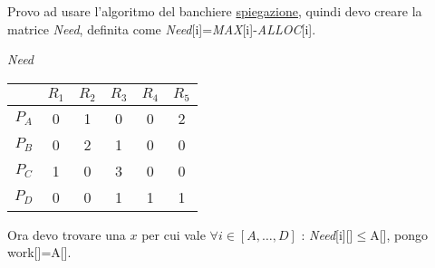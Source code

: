 \documentclass{article}
\begin{document}
    Provo ad usare l'algoritmo del banchiere \href{https://www.youtube.com/watch?app=desktop&v=LcspXXBImEo}{spiegazione}, quindi devo creare la matrice \emph{Need}, definita come \emph{Need}[i]=\emph{MAX}[i]-\emph{ALLOC}[i].
    \begin{center}
        \emph{Need}\\
        \begin{tabular}{|c|c|c|c|c|c|}
            \hline
            & $R_1$ & $R_2$ & $R_3$ & $R_4$ & $R_5$\\
            \hline
            $P_A$ & 0 & 1 & 0 & 0 & 2\\
            \hline
            $P_B$ & 0 & 2 & 1 & 0 & 0\\
            \hline
            $P_C$ & 1 & 0 & 3 & 0 & 0\\
            \hline
            $P_D$ & 0 & 0 & 1 & 1 & 1\\
            \hline
        \end{tabular}
    \end{center}
    Ora devo trovare una $x$ per cui vale $\forall i \in [A,\dots,D]$ : \emph{Need}[i][]$\le$A[], pongo work[]=A[].\\
\end{document}
